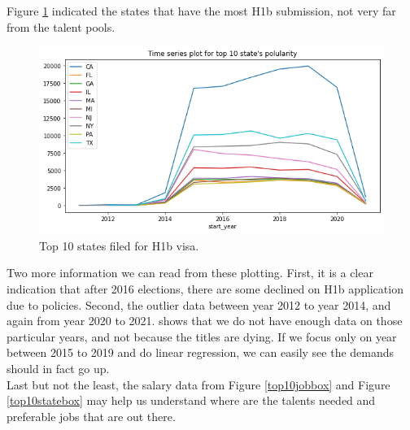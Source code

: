 Figure \ref{top10state} indicated the states that have the most H1b submission, not very far from the talent pools. \\
\begin{figure}[h!]
	\begin{center}
		\includegraphics[width=\linewidth]{./photos/top10state_timeseries.png}
	\end{center}
	\caption{Top 10 states filed for H1b visa.}
	\label{top10state}
\end{figure}
Two more information we can read from these plotting. First, it is a clear indication that after 2016 elections, there are some declined on H1b application due to policies. Second, the outlier data between year 2012 to year 2014, and again from year 2020 to 2021. shows that we do not have enough data on those particular years, and not because the titles are dying. If we focus only on year between 2015 to 2019 and do linear regression, we can easily see the demands should in fact go up. \\
Last but not the least, the salary data from Figure \ref{top10jobbox} and Figure \ref{top10statebox} may help us understand where are the talents needed and preferable jobs that are out there. 

